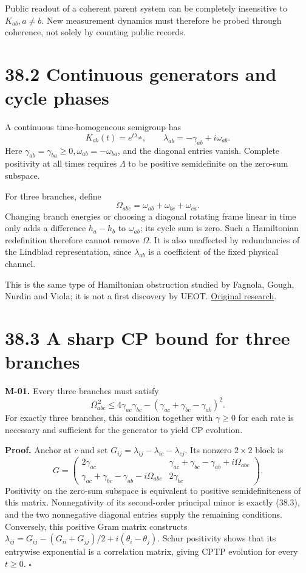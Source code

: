 \documentclass[
  11pt,
  oneside]{book}
\begin{document}
Public readout of a coherent parent system can be completely insensitive
to \(K_{ab},a\ne b\). New measurement dynamics must therefore be probed
through coherence, not solely by counting public records.

\section{38.2 Continuous generators and cycle phases}

A continuous time-homogeneous semigroup has \[
K_{ab}(t)=e^{t\lambda_{ab}},\qquad
\lambda_{ab}=-\gamma_{ab}+i\omega_{ab}.
\] Here \(\gamma_{ab}=\gamma_{ba}\ge0,\omega_{ab}=-\omega_{ba}\), and
the diagonal entries vanish. Complete positivity at all times requires
\(\Lambda\) to be positive semidefinite on the zero-sum subspace.

For three branches, define \[
\Omega_{abc}=\omega_{ab}+\omega_{bc}+\omega_{ca}.
\tag{38.2}
\] Changing branch energies or choosing a diagonal rotating frame linear
in time only adds a difference \(h_a-h_b\) to \(\omega_{ab}\); its cycle
sum is zero. Such a Hamiltonian redefinition therefore cannot remove
\(\Omega\). It is also unaffected by redundancies of the Lindblad
representation, since \(\lambda_{ab}\) is a coefficient of the fixed
physical channel.

This is the same type of Hamiltonian obstruction studied by Fagnola,
Gough, Nurdin and Viola; it is not a first discovery by UEOT.
\href{https://arxiv.org/abs/1811.11784}{Original research}.

\section{38.3 A sharp CP bound for three branches}

\label{m-01}{}

\textbf{M-01.} Every three branches must satisfy \[
\boxed{\ 
\Omega_{abc}^{\,2}
\le
4\gamma_{ac}\gamma_{bc}
-(\gamma_{ac}+\gamma_{bc}-\gamma_{ab})^2.\ }
\tag{38.3}
\] For exactly three branches, this condition together with
\(\gamma\ge0\) for each rate is necessary and sufficient for the
generator to yield CP evolution.

\textbf{Proof.} Anchor at \(c\) and set
\(G_{ij}=\lambda_{ij}-\lambda_{ic}-\lambda_{cj}\). Its nonzero
\(2\times2\) block is \[
G=
\begin{pmatrix}
2\gamma_{ac}&
\gamma_{ac}+\gamma_{bc}-\gamma_{ab}+i\Omega_{abc}\\
\gamma_{ac}+\gamma_{bc}-\gamma_{ab}-i\Omega_{abc}&
2\gamma_{bc}
\end{pmatrix}.
\] Positivity on the zero-sum subspace is equivalent to positive
semidefiniteness of this matrix. Nonnegativity of its second-order
principal minor is exactly (38.3), and the two nonnegative diagonal
entries supply the remaining conditions. Conversely, this positive Gram
matrix constructs
\(\lambda_{ij}=G_{ij}-(G_{ii}+G_{jj})/2+i(\theta_i-\theta_j)\). Schur
positivity shows that its entrywise exponential is a correlation matrix,
giving CPTP evolution for every \(t\ge0\). \(\square\)
\end{document}
